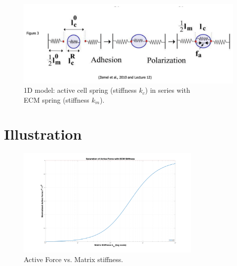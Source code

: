 \documentclass{article}
\begin{document}
\begin{figure}[h!]
  \centering
  \includegraphics[width=1\textwidth]{springs}
  \caption{1D model: active cell spring (stiffness \(k_c\)) in series with \\
  ECM spring (stiffness \(k_m\)).}
    \label{fig:1d-spring-model}
\end{figure}


\section*{Illustration}

\begin{figure}[H]
  \centering
  \includegraphics[width=0.8\textwidth]{plot}
  \caption{Active Force vs. Matrix stiffness.}
  \label{fig:activeForcet}
\end{figure}
     


\end{document}
